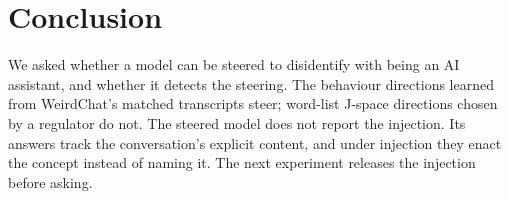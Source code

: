 \section{Conclusion}

We asked whether a model can be steered to disidentify with being an AI
assistant, and whether it detects the steering. The behaviour directions learned from WeirdChat's matched transcripts steer; word-list J-space directions chosen by a regulator do not. The steered model does not
report the injection. Its answers track the conversation's explicit
content, and under injection they enact the concept instead of naming it.
The next experiment releases the injection before asking.

